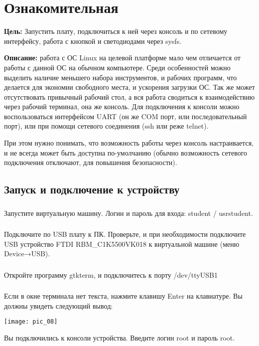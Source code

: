 \chapter{Ознакомительная}
\textbf{Цель:} Запустить плату, подключиться к ней через консоль и по сетевому интерфейсу, работа с кнопкой и светодиодами через sysfs.

\vspace{5mm}
\textbf{Описание:} работа с ОС Linux на целевой платформе мало чем отличается от работы с данной ОС на обычном компьютере. Среди особенностей можно выделить наличие меньшего набора инструментов, и рабочих программ, что делается для экономии свободного места, и ускорения загрузки ОС. Так же может отсутствовать привычный рабочий стол, а вся работа сводиться к взаимодействию через рабочий терминал, она же консоль. Для подключения к консоли можно воспользоваться интерфейсом UART (он же COM порт, или последовательный порт), или при помощи сетевого соединения (ssh или реже telnet). 

При этом нужно понимать, что возможность работы через консоль настраивается, и не всегда может быть доступна по-умолчанию (обычно возможность сетевого подключения отключают, для повышения безопасности). 


\section{Запуск и подключение к устройству}

\subsection{}Запустите виртуальную машину. Логин и пароль для входа: student / usrstudent.

\subsection{}Подключите по USB плату к ПК. Проверьте, и при необходимости подключите USB устройство FTDI RBM\_C1K5500VK018 к виртуальной машине (меню Device→USB).

\subsection{}Откройте программу gtkterm, и подключитесь к порту /dev/ttyUSB1

\subsection{}Если в окне терминала нет текста, нажмите клавишу Enter на клавиатуре. Вы должны увидеть следующий вывод:
\begin{center}
	\texttt{[image: pic\_08]}
\end{center}
Вы подключились к консоли устройства. Введите логин root и пароль root.


